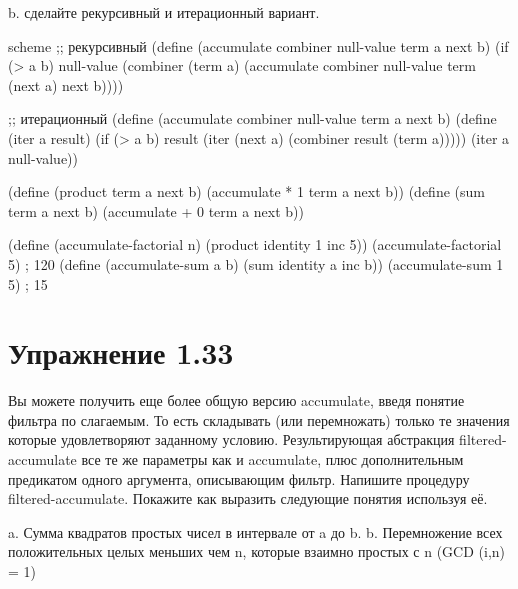 b. сделайте рекурсивный и итерационный вариант.

\begin{codelisting}{scheme}
;; рекурсивный
(define (accumulate combiner null-value term a next b)
  (if (> a b)
      null-value
      (combiner (term a)
                (accumulate combiner null-value term (next a) next b))))

;; итерационный
(define (accumulate combiner null-value term a next b)
  (define (iter a result)
    (if (> a b)
      result
      (iter (next a) (combiner result (term a)))))
  (iter a null-value))

(define (product term a next b)
  (accumulate * 1 term a next b))
(define (sum term a next b)
  (accumulate + 0 term a next b))

(define (accumulate-factorial n)
  (product identity 1 inc 5))
(accumulate-factorial 5) ; 120
(define (accumulate-sum a b)
  (sum identity a inc b))
(accumulate-sum 1 5) ; 15
\end{codelisting}


\chapter{Упражнение 1.33}

Вы можете получить еще более общую версию accumulate, введя понятие фильтра по слагаемым. То есть складывать (или перемножать) только те значения которые удовлетворяют заданному условию. Результирующая абстракция filtered-accumulate все те же параметры как и accumulate, плюс дополнительным предикатом одного аргумента, описывающим фильтр. Напишите процедуру filtered-accumulate. Покажите как выразить следующие понятия используя её.

a. Сумма квадратов простых чисел в интервале от a до b.
b. Перемножение всех положительных целых меньших чем n, которые взаимно простых с n (GCD (i,n) = 1)

